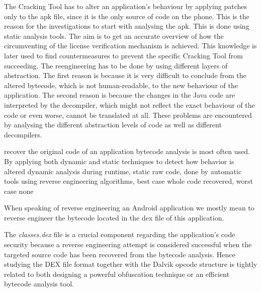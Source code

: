 The Cracking Tool has to alter an application's behaviour by applying patches only to the \gls{apk} file, since it is the only source of code on the phone. This is the reason for the investigations to start with analysing the \gls{apk}. This is done using static analysis tools. The aim is to get an accurate overview of how the circumventing of the license verification mechanism is achieved. This knowledge is later used to find countermeasures to prevent the specific Cracking Tool from succeeding.\newline
The reengineering has to be done by using different layers of abstraction. The first reason is because it is very difficult to conclude from the altered bytecode, which is not human-readable, to the new behaviour of the application. The second reason is because the changes in the Java code are interpreted by the decompiler, which might not reflect the exact behaviour of the code or even worse, cannot be translated at all.\newline
These problems are encountered by analysing the different abstraction levels of code as well as different decompilers.

%
recover the original code of an application bytecode analysis is most
often used. By applying both dynamic and static techniques to detect how behavior is altered\newline
dynamic analysis during runtime, static raw code, done by automatic tools using reverse engineering algorithms, best case whole code recovered, worst case none

When speaking of reverse engineering an Android application we mostly mean to reverse engineer the bytecode located in the dex file of this application.

The \textit{classes.dex} file is a crucial component regarding the application’s code security because a reverse engineering attempt is considered successful when the targeted source code has been recovered from the bytecode analysis. Hence studying the DEX file format together with the Dalvik opcode structure is tightly related to both designing a powerful obfuscation technique or an efficient bytecode analysis tool.
\cite{kovachevaMaster}
%

